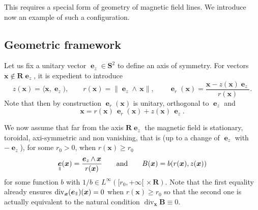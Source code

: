 \documentclass[10pt]{amsart}
\DeclareMathOperator{\Div}{div}
\theoremstyle{plain}
\theoremstyle{definition}
\newcommand\R{\mathbf R}
\newcommand\bB{{\boldsymbol B}}
\newcommand\bS{{\boldsymbol S}}
\newcommand\bfx{{\boldsymbol x}}
\DeclareMathOperator{\beD}{\boldsymbol{e}}
\newcommand\eDr{\beD_r}
\newcommand\eDz{\beD_z}
\newcommand\eDpar{\beD_\mypar}
\newcommand{\mypar}{{\mkern3mu\vphantom{\perp}\vrule depth 0pt\mkern2mu\vrule depth 0pt\mkern3mu}}
\begin{document}
This requires a special form of geometry of magnetic field lines. We introduce now an example of such a configuration.

\subsection{Geometric framework}
\label{s:geom-framework}

Let us fix a unitary vector $\eDz\in\bS^2$ to define an axis of symmetry. For vectors $\bfx\notin \R\eDz$, it is expedient to introduce
\[
z(\bfx)=\langle\bfx,\eDz),\qquad
r(\bfx)=\|\eDz\wedge\,\bfx\|,\qquad
\eDr(\bfx)=\frac{\bfx-z(\bfx)\eDz}{r(\bfx)}.
\]
Note that then by construction $\eDr(\bfx)$ is unitary, orthogonal to $\eDz$ and
\[
\bfx=r(\bfx)\,\eDr(\bfx)+z(\bfx)\,\eDz.
\]

We now assume that far from the axis $\R\eDz$ the magnetic field is stationary, toroidal, axi-symmetric and non vanishing, that is (up to a change of $\eDz$ with $-\eDz$), for some $r_0>0$, when $r(\bfx)\geq r_0$
\[
\eDpar(\bfx)=\frac{\eDz\wedge\,\bfx}{r(\bfx)}\qquad\textrm{and}\qquad
B(\bfx)=b(r(\bfx),z(\bfx))
\]
for some function $b$ with $1/b\in L^\infty([r_0,+\infty[\,\times\R)$. Note that the first equality already ensures $\Div_\bfx(\eDpar)(\bfx)=0$ when $r(\bfx)\geq r_0$ so that the second one is actually equivalent to the natural condition $\Div_\bfx\bB\equiv0$.
\end{document}
